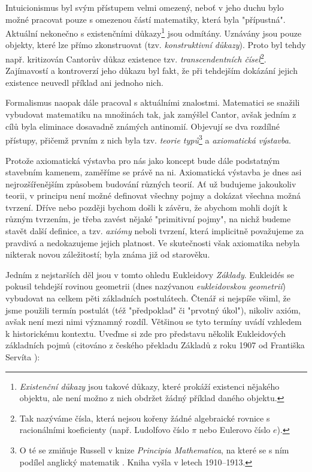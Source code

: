 Intuicionismus byl svým přístupem velmi omezený, neboť v jeho duchu bylo možné pracovat pouze s omezenou částí matematiky, která byla "přípustná". Aktuální nekonečno s existenčními důkazy\footnote{\emph{Existenční důkazy} jsou takové důkazy, které prokáží existenci nějakého objektu, ale není možno z nich obdržet žádný příklad daného objektu.} jsou odmítány. Uznávány jsou pouze objekty, které lze přímo zkonstruovat (tzv. \emph{konstruktivní důkazy}). Proto byl tehdy např. kritizován Cantorův důkaz existence tzv. \emph{transcendentních čísel}\footnote{Tak nazýváme čísla, která nejsou kořeny žádné algebraické rovnice s racionálními koeficienty (např. Ludolfovo číslo $\pi$ nebo Eulerovo číslo $e$).}. Zajímavostí a kontroverzí jeho důkazu byl fakt, že při tehdejším dokázání jejich existence neuvedl příklad ani jednoho nich.\par
Formalismus naopak dále pracoval s aktuálními znalostmi. Matematici se snažili vybudovat matematiku na množinách tak, jak zamýšlel Cantor, avšak jedním z cílů byla eliminace dosavadně známých antinomií. Objevují se dva rozdílné přístupy, přičemž prvním z nich byla tzv. \emph{teorie typů}\footnote{O té se zmiňuje Russell v knize \emph{Principia Mathematica}, na které se s ním podílel anglický matematik . Kniha vyšla v letech 1910--1913.} a \emph{axiomatická výstavba}.\par
Protože axiomatická výstavba pro nás jako koncept bude dále podstatným stavebním kamenem, zaměříme se právě na ni. Axiomatická výstavba je dnes asi nejrozšířenějším způsobem budování různých teorií. Ať už budujeme jakoukoliv teorii, v principu není možné definovat všechny pojmy a dokázat všechna možná tvrzení. Dříve nebo později bychom došli k závěru, že abychom mohli dojít k různým tvrzením, je třeba zavést nějaké "primitivní pojmy", na nichž budeme stavět další definice, a tzv. \emph{axiómy} neboli tvrzení, která implicitně považujeme za pravdivá a nedokazujeme jejich platnost. Ve skutečnosti však axiomatika nebyla nikterak novou záležitostí; byla známa již od starověku.\par
Jedním z nejstarších děl jsou v tomto ohledu Eukleidovy \emph{Základy}. Eukleidés se pokusil tehdejší rovinou geometrii (dnes nazývanou \emph{eukleidovskou geometrií}) vybudovat na celkem pěti základních postulátech. Čtenář si nejspíše všiml, že jsme použili termín postulát (též "předpoklad" či "prvotný úkol"), nikoliv axióm, avšak není mezi nimi významný rozdíl. Většinou se tyto termíny uvádí vzhledem k historickému kontextu. Uveďme si zde pro představu několik Eukleidových základních pojmů (citováno z českého překladu Základů z roku 1907 od Františka Servíta \cite{Eukleides1907}):
